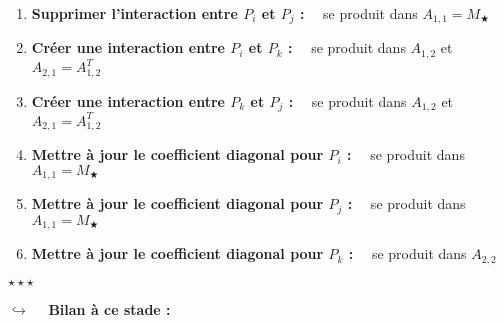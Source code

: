 \documentclass[12pt]{article}
\begin{document}
\vspace{5 mm}

\noindent
\begin{enumerate}
	\item \textbf{Supprimer l'interaction entre $P_i$ et $P_j$ :}~~ se produit dans $A_{1,1} = M_\bigstar$

\vspace{5 mm}

	\item \textbf{Créer une interaction entre $P_i$ et $P_k$ :}~~ se produit dans $A_{1,2}$ et $A_{2,1} = A_{1,2}^T$

\vspace{5 mm}
	
	\item \textbf{Créer une interaction entre $P_k$ et $P_j$ :}~~ se produit dans $A_{1,2}$ et $A_{2,1} = A_{1,2}^T$

\vspace{5 mm}

	\item \textbf{Mettre à jour le coefficient diagonal pour $P_i$ :}~~ se produit dans $A_{1,1} = M_\bigstar$

\vspace{5 mm}

	\item \textbf{Mettre à jour le coefficient diagonal pour $P_j$ :}~~ se produit dans $A_{1,1} = M_\bigstar$

\vspace{5 mm}

	\item \textbf{Mettre à jour le coefficient diagonal pour $P_k$ :}~~ se produit dans $A_{2,2}$
\end{enumerate}

\vspace{10 mm}

\begin{center}
$\star \star \star$
\end{center}

\noindent
$\hookrightarrow$~~ \textbf{Bilan à ce stade :}~~

\vspace{5 mm}
\end{document}
